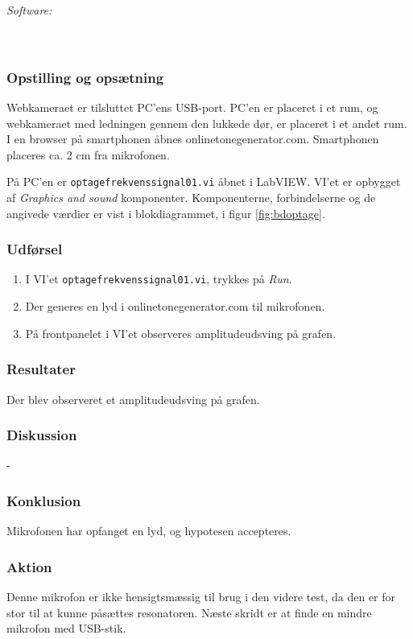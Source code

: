 			\textit{Software:}\\
			\labview\\
			\onlineg\\
	
		\subsubsection{Opstilling og opsætning}
		Webkameraet er tilsluttet PC'ens USB-port. PC'en er placeret i et rum, og webkameraet med ledningen gennem den lukkede dør, er placeret i et andet rum. I en browser på smartphonen åbnes onlinetonegenerator.com. Smartphonen placeres ca. 2 cm fra mikrofonen.  
			
			På PC'en er \texttt{optagefrekvenssignal01.vi} åbnet i LabVIEW. VI'et er opbygget af \textit{Graphics and sound} komponenter. Komponenterne, forbindelserne og de angivede værdier er vist i blokdiagrammet, i figur \ref{fig:bdoptage}.   \\ 
			 
		\subsubsection{Udførsel}
			\begin{enumerate}
				\item I VI'et \texttt{optagefrekvenssignal01.vi}, trykkes på \textit{Run}.  
				\item Der generes en lyd i onlinetonegenerator.com til mikrofonen. 
				\item På frontpanelet i VI'et observeres amplitudeudsving på grafen.  
			\end{enumerate}
		
		\subsubsection{Resultater}
		Der blev observeret et amplitudeudsving på grafen. 
		\subsubsection{Diskussion} 
		-
		\subsubsection{Konklusion}
		Mikrofonen har opfanget en lyd, og hypotesen accepteres. 
		
		\subsubsection{Aktion}
		Denne mikrofon er ikke hensigtsmæssig til brug i den videre test, da den er for stor til at kunne påsættes resonatoren. Næste skridt er at finde en mindre mikrofon med USB-stik. 
		
